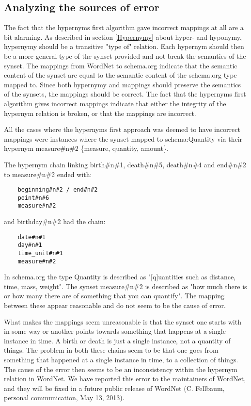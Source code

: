 \subsection{Analyzing the sources of error}
The fact that the hypernyms first algorithm gave incorrect mappings at all are a bit alarming.
As described in section \ref{Hypernymy} about hyper- and hyponymy, hypernymy should be a transitive "type of" relation.
Each hypernym should then be a more general type of the synset provided and not break the semantics of the synset.
The mappings from WordNet to schema.org indicate that the semantic content of the synset are equal to the
semantic content of the schema.org type mapped to.
Since both hypernymy and mappings should preserve the semantics of the synsets, the mappings should be correct.
The fact that the hypernyms first algorithm gives incorrect mappings indicate that either the integrity of the hypernym relation is broken,
or that the mappings are incorrect.

All the cases where the hypernyms first approach was deemed to have incorrect mappings were instances where the synset
mapped to schema:Quantity via their hypernym measure\#n\#2 \{measure, quantity, amount\}.

The hypernym chain linking birth\#n\#1, death\#n\#5, death\#n\#4 and end\#n\#2 to measure\#n\#2 ended with:
\begin{verbatim}
	beginning#n#2 / end#n#2
	point#n#6
	measure#n#2
\end{verbatim}

and birthday\#n\#2 had the chain:
\begin{verbatim}
	date#n#1
	day#n#1
	time_unit#n#1
	measure#n#2
\end{verbatim}


In schema.org the type Quantity is described as "[q]uantities such as distance, time, mass, weight".
The synset measure\#n\#2 is described as "how much there is or how many there are of something that you can quantify".
The mapping between these appear reasonable and do not seem to be the cause of error.

What makes the mappings seem unreasonable is that the synset one starts with in some way or another points towards
something that happens at a single instance in time.
A birth or death is just a single instance, not a quantity of things.
The problem in both these chains seem to be that one goes from something that happened at a single instance in time,
to a collection of things.
The cause of the error then seems to be an inconsistency within the hypernym relation in WordNet.
We have reported this error to the maintainers of WordNet, and they will be fixed in a future public release of WordNet
(C. Fellbaum, personal communication, May 13, 2013).

